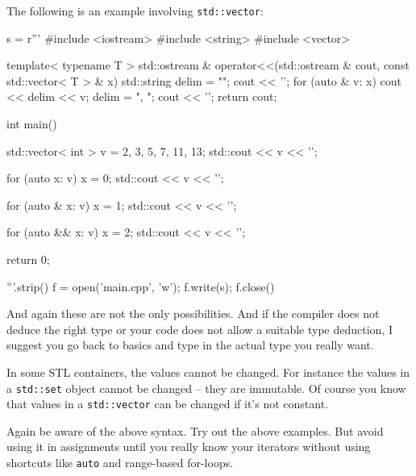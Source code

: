 The following is an example involving \verb!std::vector!:
\begin{python}
s = r'''
#include <iostream>
#include <string>
#include <vector>

template< typename T >
std::ostream & operator<<(std::ostream & cout,
                          const std::vector< T > & x)
{
    std::string delim = "";
    cout << '{';
    for (auto & v: x)
    {
        cout << delim << v;
        delim = ", ";
    }
    cout << '}';
    return cout;
}

int main()
{
    std::vector< int > v = {2, 3, 5, 7, 11, 13};
    std::cout << v << '\n';

    for (auto x: v)
    {
        x = 0;
    }
    std::cout << v << '\n';
    
    for (auto & x: v)
    {
        x = 1;
    }
    std::cout << v << '\n';
    
    for (auto && x: v)
    {
        x = 2;
    }
    std::cout << v << '\n';
    
    return 0;
}
'''.strip()
f = open('main.cpp', 'w'); f.write(s); f.close()
\end{python}
And again these are not the only possibilities.
And if the compiler does not deduce the right type
or your code does not allow a suitable type deduction,
I suggest you go back to basics and type in the actual type you really want.

In some STL containers, the values cannot be changed. 
For instance the
values in a \verb!std::set! object cannot be changed -- they are immutable.
Of course you know that
values in a \verb!std::vector! can be changed if it's not constant.

Again be aware of the above syntax.
Try out the above examples.
But avoid using it in assignments
until you really know your iterators without using shortcuts
like \verb!auto! and range-based for-loops.


